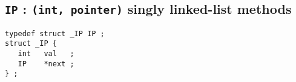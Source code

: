 \par
\subsection{{\tt IP} : 
               {\tt (int, pointer)} singly linked-list methods}
\label{subsection:Utilities:proto:IP}
\par
\hspace{0.5 in}
\begin{minipage}{2.5 in}
\begin{verbatim}
typedef struct _IP IP ;
struct _IP {
   int   val   ;
   IP    *next ;
} ;
\end{verbatim}
\end{minipage}

\par
